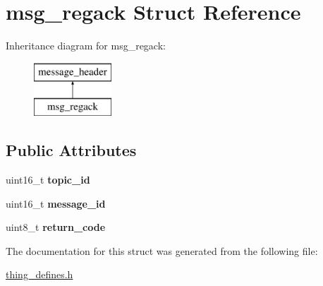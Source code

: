 \hypertarget{structmsg__regack}{\section{msg\-\_\-regack Struct Reference}
\label{structmsg__regack}
}
Inheritance diagram for msg\-\_\-regack\-:\begin{figure}[H]
\begin{center}
\leavevmode
\includegraphics[height=2.000000cm]{structmsg__regack}
\end{center}
\end{figure}
\subsection*{Public Attributes}
\begin{DoxyCompactItemize}
\item 
\hypertarget{structmsg__regack_ad3226ef797365afe79888574d4582f8f}{uint16\-\_\-t {\bfseries topic\-\_\-id}}\label{structmsg__regack_ad3226ef797365afe79888574d4582f8f}

\item 
\hypertarget{structmsg__regack_ac036777c051eeeac62927abb797c3a26}{uint16\-\_\-t {\bfseries message\-\_\-id}}\label{structmsg__regack_ac036777c051eeeac62927abb797c3a26}

\item 
\hypertarget{structmsg__regack_a7b3a7992c75e123416d68648bc59892e}{uint8\-\_\-t {\bfseries return\-\_\-code}}\label{structmsg__regack_a7b3a7992c75e123416d68648bc59892e}

\end{DoxyCompactItemize}


The documentation for this struct was generated from the following file\-:\begin{DoxyCompactItemize}
\item 
\hyperlink{thing__defines_8h}{thing\-\_\-defines.\-h}\end{DoxyCompactItemize}
